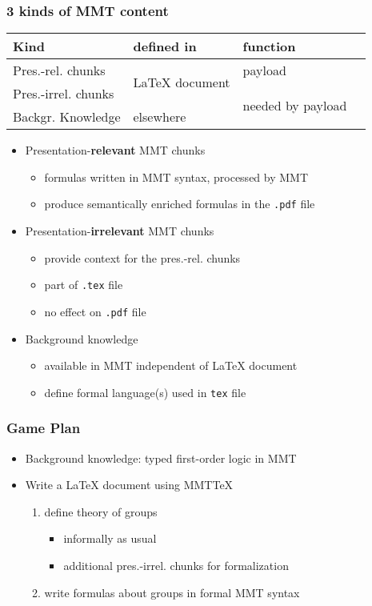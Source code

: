 \begin{frame}\frametitle{3 kinds of MMT content}
\begin{center}
\begin{tabular}{|l||l|l|l|}
\hline
Kind & defined in & function \\
\hline
\hline
Pres.-rel. chunks   & \multirow{2}{*}{LaTeX document}  & payload\\
\cline{1-1}\cline{3-3}
Pres.-irrel. chunks &  & \multirow{2}{*}{needed by payload}\\
\cline{1-2}
Backgr. Knowledge         & elsewhere & \\
\hline
\end{tabular}
\end{center}

\begin{itemize}
\item Presentation-\textbf{relevant} MMT chunks
 \begin{itemize}
 \item formulas written in MMT syntax, processed by MMT
 \item produce semantically enriched formulas in the \texttt{.pdf} file
 \end{itemize}
\item Presentation-\textbf{irrelevant} MMT chunks
 \begin{itemize}
 \item provide context for the pres.-rel. chunks
 \item part of \texttt{.tex} file
 \item no effect on \texttt{.pdf} file
 \end{itemize}
\item Background knowledge
 \begin{itemize}
 \item available in MMT independent of LaTeX document
 \item define formal language(s) used in \texttt{tex} file
 \end{itemize}
\end{itemize}
\end{frame}

\begin{frame}\frametitle{Game Plan}
\begin{itemize}
\item Background knowledge: typed first-order logic in MMT
\item Write a LaTeX document using MMTTeX
 \begin{enumerate}
  \item define theory of groups
  \begin{itemize}
   \item informally as usual
   \item additional pres.-irrel. chunks for formalization
  \end{itemize}
  \item write formulas about groups in formal MMT syntax
 \end{enumerate}
\end{itemize}
\end{frame}

